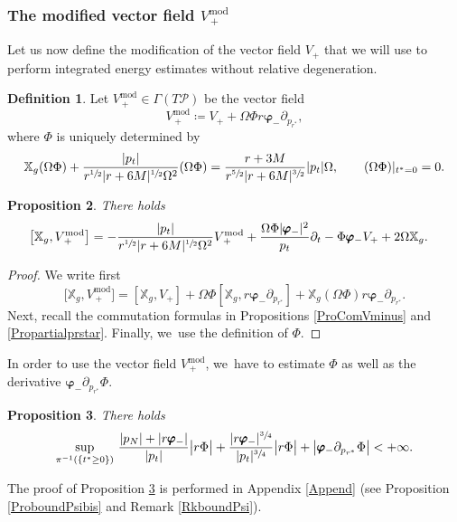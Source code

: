 \documentclass[10pt]{amsart}
\theoremstyle{plain}
\newtheorem{proposition}{Proposition}[section]
\theoremstyle{definition}
\newtheorem{definition}[proposition]{Definition}
\newcommand\T{{\mathbb{X}}}
\begin{document}
\subsubsection{The modified vector field $V_{\, +}^{\mathrm{mod}}$}\label{subsub_modified}

Let us now define the modification of the vector field $V_+$ that we will use to perform integrated energy estimates without relative degeneration.

\begin{definition}\label{DefVminusmod}
Let $V_{\, +}^{\mathrm{mod}} \in \Gamma(T \mathcal{P})$ be the vector field
\[
V_{\, +}^{\mathrm{mod}} \coloneqq V_++\Omega \Phi r \pmb{\varphi}_- \partial_{p_{r^*}},
\]
where $\Phi$ is uniquely determined by
\[
\T_g (\Omega \Phi)+ \frac{|p_t|}{r^{\sfrac{1}{2}}|r+6M|^{\sfrac{1}{2}}\Omega^2} (\Omega \Phi) = \frac{r+3M}{r^{\sfrac{5}{2}}|r+6M|^{\sfrac{3}{2}}}|p_t|\Omega, \qquad (\Omega\Phi)\vert_{t^*=0}=0.
\]
\end{definition}

\begin{proposition}\label{ProComVminusmod}
There holds
\begin{align*}
\bigl[\T_g, V_{\, +}^{\mathrm{mod}}\bigr] &= - \frac{|p_t|}{r^{\sfrac{1}{2}}|r+6M|^{\sfrac{1}{2}}\Omega^2} V_{\, +}^{\mathrm{mod}}+ \frac{\Omega\Phi |\pmb{\varphi}_-|^2}{ p_t} \partial_t- \Phi \pmb{\varphi}_- V_+ + 2\Omega \T_g.
\end{align*}
\end{proposition}
\begin{proof}
We write first
\[
\bigl[\T_g, V_{\, +}^{\mathrm{mod}}\bigr] = [\T_g, V_+] +\Omega \Phi [\T_g, r \pmb{\varphi}_- \partial_{p_{r^*}} ]+ \T_g(\Omega\Phi) r \pmb{\varphi}_- \partial_{p_{r^*}}.
\]
Next, recall the commutation formulas in Propositions \ref{ProComVminus} and \ref{Propartialprstar}. Finally, we~use the definition of $\Phi$.
\end{proof}

In order to use the vector field $V_{\, +}^{\mathrm{mod}}$, we~have to estimate $\Phi$ as well as the derivative $\pmb{\varphi}_- \partial_{p_{r^*}} \Phi$.

\begin{proposition}\label{ProboundPsi}
There holds
\[
\sup_{ \pi^{-1} (\{t^* \geq 0 \})} \,\frac{|p_N|+|r \pmb{\varphi}_-|}{|p_t|} \big| r\Phi \big|+\frac{|r\pmb{\varphi}_-|^{\sfrac{3}{4}}}{|p_t|^{\sfrac{3}{4}}} \big| r\Phi \big|+\big|\pmb{\varphi}_- \partial_{p_{r^*}} \Phi \big| < +\infty.
\]
\end{proposition}
The proof of Proposition \ref{ProboundPsi} is performed in Appendix \ref{Append} (see Proposition \ref{ProboundPsibis} and Remark \ref{RkboundPsi}).
\end{document}
